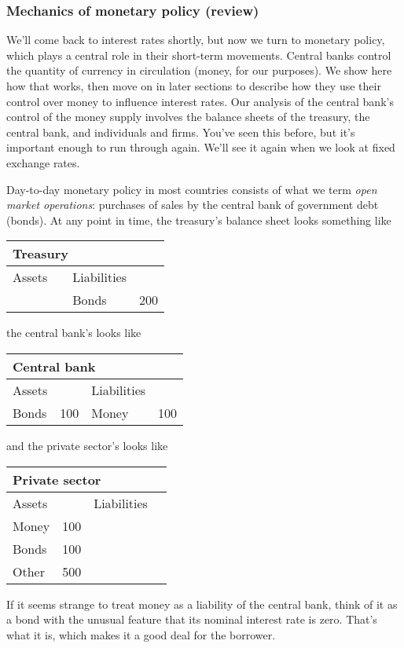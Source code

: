 \documentclass[letterpaper,12pt]{article}
\begin{document}
\subsubsection*{Mechanics of monetary policy (review)}

We'll come back to interest rates shortly,
but now we turn to monetary policy, 
which plays a central role in their short-term movements.
Central banks control the quantity of currency
in circulation (money, for our purposes).
We show here how that works,
then move on in later sections to describe
how they use their control over money to
influence interest rates.
Our analysis of the central bank's control
of the money supply involves the balance sheets of the treasury,
the central bank, and individuals and firms.
You've seen this before, but it's
important enough to run through again.
We'll see it again when we look at fixed exchange rates.


Day-to-day monetary policy in most countries consists of what we term
{\it open market operations\/}:  
purchases of sales by the central bank of government debt (bonds).
At any point in time, the treasury's balance sheet looks
something like
%
\begin{center}
\begin{tabular}{lr|lr}
\multicolumn{4}{l}{Treasury} \\
\hline
Assets  &&  Liabilities \\
\hline
\phantom{Bonds} & \phantom{200} & Bonds & 200
\end{tabular}
\end{center}
%
the central bank's looks like
%
\begin{center}
\begin{tabular}{lr|lr}
\multicolumn{4}{l}{Central bank} \\
\hline
Assets  &&  Liabilities \\
\hline
Bonds &  100 & Money & 100
\end{tabular}
\end{center}
%
and the private sector's looks like
%
\begin{center}
\begin{tabular}{lr|lr}
\multicolumn{4}{l}{Private sector} \\
\hline
Assets  &&  Liabilities \\
\hline
Money &  100  &  \phantom{Money} & \phantom{100} \\
Bonds &  100  \\
Other &  500
\end{tabular}
\end{center}
%
If it seems strange to treat money as a liability of the
central bank, think of it as a bond with the unusual
feature that its nominal interest rate is zero.
That's what it is, which makes it a good deal for the borrower.
\end{document}
